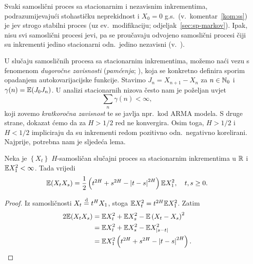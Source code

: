 \documentclass[main.tex]{subfiles}
\begin{document}
Svaki samoslični proces sa stacionarnim i nezavisnim inkrementima, podrazumijevajući stohastičku neprekidnost i \( X_0=0 \) g.s.\ (v.\ komentar~\ref{kom:ss}) je
\levy jev strogo stabilni proces (uz ev.\ modifikaciju; odjeljak~\ref{sec:sp-markov}).
Ipak, nisu svi samoslični procesi \levy jevi, pa se proučavaju odvojeno samoslični procesi čiji su inkrementi
jedino stacionarni odn.\ jedino nezavisni (v.~\cite{em}).

U slučaju samosličnih procesa sa stacionarnim inkrementima, možemo naći vezu s fenomenom
\emph{dugoročne zavisnosti} (\emph{pamćenja}; \cite[]{em}), koja se konkretno
definira sporim opadanjem autokovarijacijske funkcije. Stavimo \( J_n = X_{n+1}-X_n \) za \( n \in \mathbb{N}_0 \)
i \( \gamma(n) = \mathbb{E}(J_0J_n) \). U analizi stacionarnih nizova često nam je poželjan uvjet
\[
	\sum_n \gamma(n) < \infty,
\]
koji zovemo \emph{kratkoročna zavisnost} te se javlja npr.\ kod ARMA modela. S druge strane, dokazat ćemo da
za \( H > 1/2 \) red ne konvergira. Osim toga, \( H>1/2 \) i \( H<1/2 \) impliciraju da su
inkrementi redom pozitivno odn.\ negativno korelirani.
Najprije, potrebna nam je sljedeća lema.

\begin{lema}\label{lema:sssi}
	Neka je \( \left\{ X_t \right\} \) \( H \)-samosličan slučajni proces sa stacionarnim inkrementima
	u \( \mathbb{R} \) i \( \mathbb{E} X_1^2 < \infty \). Tada vrijedi
	\begin{equation}
		\mathbb{E}(X_tX_s) = \frac 12 \left( t^{2H}+s^{2H}-\left| {t-s} \right|^{2H} \right) \mathbb{E} X_1^2
		, \quad t,s \ge 0.
	\end{equation}
\end{lema}

\begin{proof}
	Iz samosličnosti \( X_t \stackrel{\mathrm d}{=} t^HX_1 \), stoga \( \mathbb{E} X_t^2 = t^{2H}\mathbb{E} X_1^2 \). Zatim
	\begin{align}
		2 \E(X_tX_s) & =  \E X_t^2 + \E X_s^2 - \E\left( X_t-X_s \right)^2          \\
		             & =  \E X_t^2 + \E X_s^2 - \E X_{\abs{s-t}} ^2                 \\
		             & =  \E X_1^2 \left( t^{2H} + s^{2H} - \abs{t-s}^{2H} \right). %
	\end{align}
\end{proof}
\end{document}
